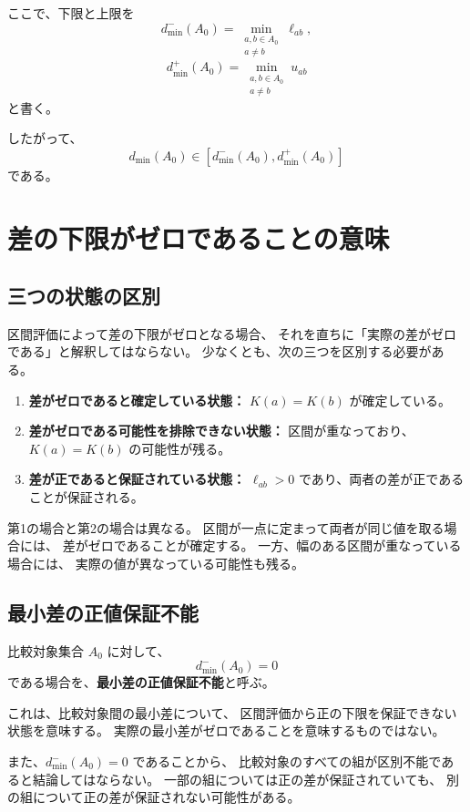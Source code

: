 \documentclass[a4paper,12pt]{article}
\begin{document}
ここで、下限と上限を
\[
    d_{\min}^-(A_0)
    =
    \min_{\substack{a,b\in A_0\\a\ne b}}\ell_{ab},
\]
\[
    d_{\min}^+(A_0)
    =
    \min_{\substack{a,b\in A_0\\a\ne b}}u_{ab}
\]
と書く。

したがって、
\[
    d_{\min}(A_0)
    \in[d_{\min}^-(A_0),d_{\min}^+(A_0)]
\]
である。

\section{差の下限がゼロであることの意味}

\subsection{三つの状態の区別}

区間評価によって差の下限がゼロとなる場合、
それを直ちに「実際の差がゼロである」と解釈してはならない。
少なくとも、次の三つを区別する必要がある。

\begin{enumerate}[label=(\arabic*)]
    \item \textbf{差がゼロであると確定している状態：}
    $K(a)=K(b)$ が確定している。
    \item \textbf{差がゼロである可能性を排除できない状態：}
    区間が重なっており、$K(a)=K(b)$ の可能性が残る。
    \item \textbf{差が正であると保証されている状態：}
    $\ell_{ab}>0$ であり、両者の差が正であることが保証される。
\end{enumerate}

第1の場合と第2の場合は異なる。
区間が一点に定まって両者が同じ値を取る場合には、
差がゼロであることが確定する。
一方、幅のある区間が重なっている場合には、
実際の値が異なっている可能性も残る。

\subsection{最小差の正値保証不能}

比較対象集合 $A_0$ に対して、
\[
    d_{\min}^-(A_0)=0
\]
である場合を、\textbf{最小差の正値保証不能}と呼ぶ。

これは、比較対象間の最小差について、
区間評価から正の下限を保証できない状態を意味する。
実際の最小差がゼロであることを意味するものではない。

また、$d_{\min}^-(A_0)=0$ であることから、
比較対象のすべての組が区別不能であると結論してはならない。
一部の組については正の差が保証されていても、
別の組について正の差が保証されない可能性がある。
\end{document}
